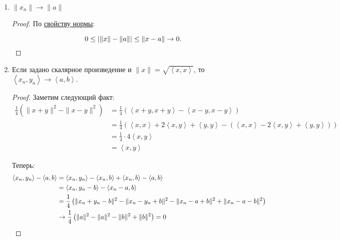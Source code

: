 \begin{theorem}
\begin{enumerate}
\begin{proof}
                $-y_{n} = -1 \cdot y_{n} \implies -1 \cdot b = -b$, $x_{n} + (-y_{n}) \to a + (-b) = a - b$.
            \end{proof}
        \item $\|x_{n}\| \to \|a\|$ 
            \begin{proof} \thmslashn
            
                По \hyperref[norm:diff_of_norms]{свойству нормы}:

                \[ 0 \le \left| \|x\| - \|a\| \right| \le \|x - a\| \to 0.\qedhere\] 
            \end{proof}
        \item Если задано скалярное произведение и $\|x\| = \sqrt{\left<x, x\right>} $, то $\left<x_{n}, y_{n}\right> \to \left<a, b\right>$.
            \begin{proof} \thmslashn
            
                Заметим следующий факт:
                \begin{equation*}
                    \begin{split}
                        \frac{1}{4}\left( \|x + y\|^2 - \|x - y\|^2 \right) 
                        &= \frac{1}{4}\left( \left<x + y, x + y\right> - \left<x - y, x - y\right> \right) \\
                        &= \frac{1}{4}\left( \left<x, x\right> + 2\left<x, y\right> + \left<y, y\right> - \left( \left<x, x\right> -2\left<x, y\right> + \left<y, y\right> \right)  \right)\\
                        &= \frac{1}{4} \cdot 4\left<x, y\right>\\
                        &= \left<x, y\right>
                    \end{split}
                \end{equation*}

                Теперь:
                \begin{equation*}
                    \begin{split}
                        \left<x_{n}, y_{n}\right> - \left<a, b\right> 
                        &= \left<x_{n}, y_{n}\right> - \left<x_{n}, b\right> + \left<x_{n}, b\right> - \left<a, b\right>\\
                        &= \left<x_{n}, y_{n} - b\right> - \left<x_{n} - a, b\right>\\
                        &= \frac{1}{4}\left( \|x_{n} + y_{n} - b\|^2 - \|x_{n} - y_{n} + b\|^2 - \|x_{n} - a + b\|^2 + \|x_{n} - a - b\|^2  \right)\\
                        &\to  \frac{1}{4}\left( \|a\|^2 - \|a\|^2 - \|b\|^2 + \|b\|^2  \right) = 0 \qedhere 
                    \end{split}
                \end{equation*}
            \end{proof}
    \end{enumerate}
\end{theorem}
